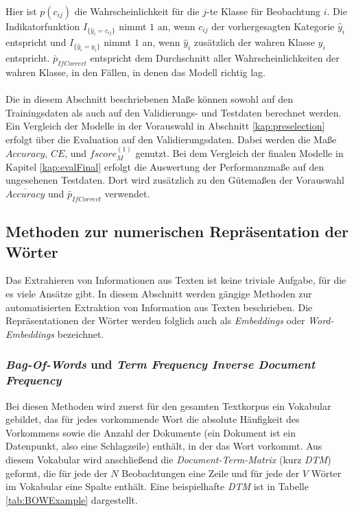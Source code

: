 \documentclass[a4paper,11pt]{article}
\begin{document}
Hier ist $p(c_{ij})$ die Wahrscheinlichkeit für die $j$-te Klasse für Beobachtung $i$. Die Indikatorfunktion $I_{\{\hat{y}_i = c_{ij}\}}$ nimmt $1$ an, wenn $c_{ij}$ der vorhergesagten Kategorie $\hat{y}_i$ entspricht und $I_{\{\hat{y}_i = y_i\}}$ nimmt $1$ an, wenn $\hat{y}_i$ zusätzlich der wahren Klasse $y_i$ entspricht. $\bar{p}_{IfCorrect}$ entspricht dem Durchschnitt aller Wahrscheinlichkeiten der wahren Klasse, in den Fällen, in denen das Modell richtig lag.\\
\\
Die in diesem Abschnitt beschriebenen Maße können sowohl auf den Trainingsdaten als auch auf den  Validierungs- und Testdaten berechnet werden. Ein Vergleich der Modelle in der Vorauswahl in Abschnitt \ref{kap:preselection} erfolgt über die Evaluation auf den Validierungsdaten. Dabei werden die Maße $Accuracy$, $CE$, und $fscore_M^{(1)}$ genutzt.
Bei dem Vergleich der finalen Modelle in Kapitel \ref{kap:evalFinal} erfolgt die Auswertung der Performanzmaße auf den ungesehenen Testdaten. Dort wird zusätzlich zu den Gütemaßen der Vorauswahl $\overline{Accuracy}$ und $\bar{p}_{IfCorrect}$ verwendet.


\subsection{Methoden zur numerischen Repräsentation der Wörter} \label{kap:3.1Wordemb}

Das Extrahieren von Informationen aus Texten ist keine triviale Aufgabe, für die es viele Ansätze gibt. In diesem Abschnitt werden gängige Methoden zur automatisierten Extraktion von Information aus Texten beschrieben. Die Repräsentationen der Wörter werden folglich auch als \textit{Embeddings} oder \textit{Word-Embeddings} bezeichnet.


\subsubsection{\textit{Bag-Of-Words} und \textit{Term Frequency Inverse Document Frequency}} \label{Kap:Tfidf}

Bei diesen Methoden wird zuerst für den gesamten Textkorpus ein Vokabular gebildet, das für jedes vorkommende Wort die absolute Häufigkeit des Vorkommens sowie die Anzahl der Dokumente (ein Dokument ist ein Datenpunkt, also eine Schlagzeile) enthält, in der das Wort vorkommt. Aus diesem Vokabular wird anschließend die \textit{Document-Term-Matrix} (kurz \textit{DTM}) geformt, die für jede der $N$ Beobachtungen eine Zeile und für jede der $V$ Wörter im Vokabular eine Spalte enthält. Eine beispielhafte \textit{DTM} ist in Tabelle \ref{tab:BOWExample} dargestellt.
\end{document}
